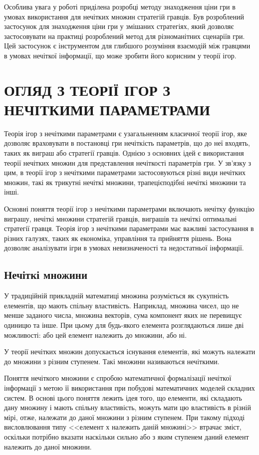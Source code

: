 \documentclass[14pt, a4paper, oneside]{extarticle}
\numberwithin{equation}{section}
\begin{document}
Особлива увага у роботі приділена розробці методу знаходження ціни гри в умовах використання для нечітких множин стратегій гравців. Був розроблений застосунок для знаходження ціни гри у змішаних стратегіях, який дозволяє застосовувати на практиці розроблений метод для різноманітних сценаріїв гри. Цей застосунок є інструментом для глибшого розуміння взаємодій між гравцями в умовах нечіткої інформації, що може зробити його корисним у теорії ігор.

\section{ОГЛЯД З ТЕОРІЇ ІГОР З НЕЧІТКИМИ ПАРАМЕТРАМИ}

Теорія ігор з нечіткими параметрами є узагальненням класичної теорії ігор, яке дозволяє враховувати в постановці гри нечіткість параметрів, що до неї входять, таких як виграш або стратегії гравців. Однією з основних ідей є використання теорії нечітких множин для представлення нечіткості параметрів гри. У зв'язку з цим, в теорії ігор з нечіткими параметрами застосовуються різні види нечітких множин, такі як трикутні нечіткі множини, трапецієподібні нечіткі множини та інші.

Основні поняття теорії ігор з нечіткими параметрами включають нечітку функцію виграшу, нечіткі множини стратегій гравців, виграшів та нечіткі оптимальні стратегії гравця. Теорія ігор з нечіткими параметрами має важливі застосування в різних галузях, таких як економіка, управління та прийняття рішень. Вона дозволяє аналізувати ігри в умовах невизначеності та недостатньої інформації.

\subsection{Нечіткі множини}

У традиційній прикладній математиці множина розуміється як сукупність елементів, що мають спільну властивість. Наприклад, множина чисел, що не менше заданого числа, множина векторів, сума компонент яких не перевищує одиницю та інше. При цьому для будь-якого елемента розглядаються лише дві можливості: або цей елемент належить до множини, або ні.

У теорії нечітких множин  допускається існування елементів, які можуть належати до множини з різним ступенем. Такі множини називаються нечіткими.

Поняття нечіткого множини є спробою математичної формалізації нечіткої інформації з метою її використання при побудові математичних моделей складних систем. В основі цього поняття лежить ідея того, що елементи, які складають дану множину і мають спільну властивість, можуть мати цю властивість в різній мірі, отже, належати до даної множини з різним ступенем. При такому підході висловлювання типу <<елемент $х$ належить даній множині>> втрачає зміст, оскільки потрібно вказати наскільки сильно або з яким ступенем даний елемент належить до даної множини.
\end{document}
